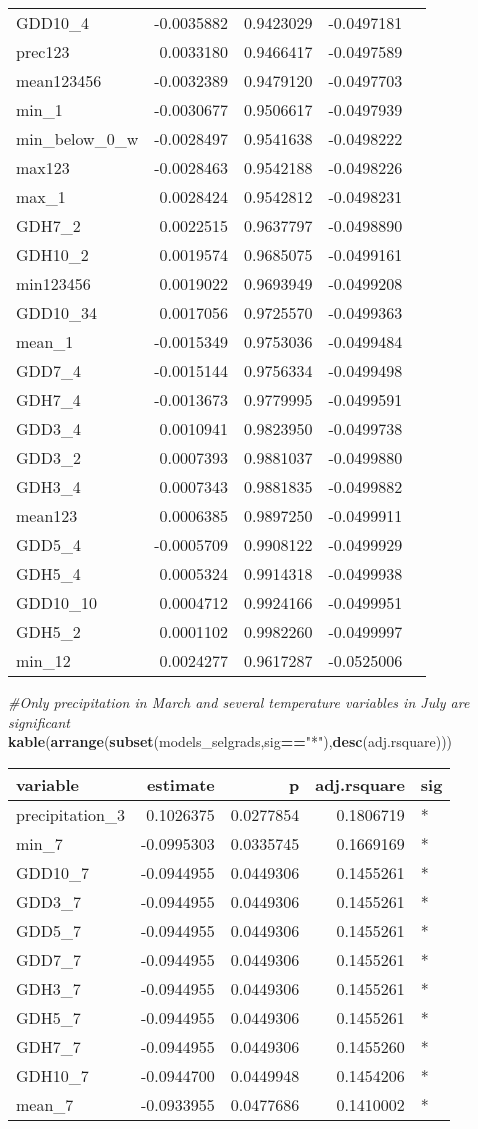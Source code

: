 \documentclass[]{article}
\newenvironment{Shaded}{\begin{snugshade}}{\end{snugshade}}
\newcommand{\KeywordTok}[1]{\textcolor[rgb]{0.13,0.29,0.53}{\textbf{#1}}}
\newcommand{\StringTok}[1]{\textcolor[rgb]{0.31,0.60,0.02}{#1}}
\newcommand{\CommentTok}[1]{\textcolor[rgb]{0.56,0.35,0.01}{\textit{#1}}}
\newcommand{\OperatorTok}[1]{\textcolor[rgb]{0.81,0.36,0.00}{\textbf{#1}}}
\newcommand{\NormalTok}[1]{#1}
\begin{document}
\begin{longtable}[]{@{}lrrrl@{}}
GDD10\_4 & -0.0035882 & 0.9423029 & -0.0497181 &\tabularnewline
prec123 & 0.0033180 & 0.9466417 & -0.0497589 &\tabularnewline
mean123456 & -0.0032389 & 0.9479120 & -0.0497703 &\tabularnewline
min\_1 & -0.0030677 & 0.9506617 & -0.0497939 &\tabularnewline
min\_below\_0\_w & -0.0028497 & 0.9541638 & -0.0498222 &\tabularnewline
max123 & -0.0028463 & 0.9542188 & -0.0498226 &\tabularnewline
max\_1 & 0.0028424 & 0.9542812 & -0.0498231 &\tabularnewline
GDH7\_2 & 0.0022515 & 0.9637797 & -0.0498890 &\tabularnewline
GDH10\_2 & 0.0019574 & 0.9685075 & -0.0499161 &\tabularnewline
min123456 & 0.0019022 & 0.9693949 & -0.0499208 &\tabularnewline
GDD10\_34 & 0.0017056 & 0.9725570 & -0.0499363 &\tabularnewline
mean\_1 & -0.0015349 & 0.9753036 & -0.0499484 &\tabularnewline
GDD7\_4 & -0.0015144 & 0.9756334 & -0.0499498 &\tabularnewline
GDH7\_4 & -0.0013673 & 0.9779995 & -0.0499591 &\tabularnewline
GDD3\_4 & 0.0010941 & 0.9823950 & -0.0499738 &\tabularnewline
GDD3\_2 & 0.0007393 & 0.9881037 & -0.0499880 &\tabularnewline
GDH3\_4 & 0.0007343 & 0.9881835 & -0.0499882 &\tabularnewline
mean123 & 0.0006385 & 0.9897250 & -0.0499911 &\tabularnewline
GDD5\_4 & -0.0005709 & 0.9908122 & -0.0499929 &\tabularnewline
GDH5\_4 & 0.0005324 & 0.9914318 & -0.0499938 &\tabularnewline
GDD10\_10 & 0.0004712 & 0.9924166 & -0.0499951 &\tabularnewline
GDH5\_2 & 0.0001102 & 0.9982260 & -0.0499997 &\tabularnewline
min\_12 & 0.0024277 & 0.9617287 & -0.0525006 &\tabularnewline
\bottomrule
\end{longtable}

\begin{Shaded}
\begin{Highlighting}[]
\CommentTok{#Only precipitation in March and several temperature variables in July are significant}
\KeywordTok{kable}\NormalTok{(}\KeywordTok{arrange}\NormalTok{(}\KeywordTok{subset}\NormalTok{(models_selgrads,sig}\OperatorTok{==}\StringTok{"*"}\NormalTok{),}\KeywordTok{desc}\NormalTok{(adj.rsquare)))}
\end{Highlighting}
\end{Shaded}

\begin{longtable}[]{@{}lrrrl@{}}
\toprule
variable & estimate & p & adj.rsquare & sig\tabularnewline
\midrule
\endhead
precipitation\_3 & 0.1026375 & 0.0277854 & 0.1806719 & *\tabularnewline
min\_7 & -0.0995303 & 0.0335745 & 0.1669169 & *\tabularnewline
GDD10\_7 & -0.0944955 & 0.0449306 & 0.1455261 & *\tabularnewline
GDD3\_7 & -0.0944955 & 0.0449306 & 0.1455261 & *\tabularnewline
GDD5\_7 & -0.0944955 & 0.0449306 & 0.1455261 & *\tabularnewline
GDD7\_7 & -0.0944955 & 0.0449306 & 0.1455261 & *\tabularnewline
GDH3\_7 & -0.0944955 & 0.0449306 & 0.1455261 & *\tabularnewline
GDH5\_7 & -0.0944955 & 0.0449306 & 0.1455261 & *\tabularnewline
GDH7\_7 & -0.0944955 & 0.0449306 & 0.1455260 & *\tabularnewline
GDH10\_7 & -0.0944700 & 0.0449948 & 0.1454206 & *\tabularnewline
mean\_7 & -0.0933955 & 0.0477686 & 0.1410002 & *\tabularnewline
\bottomrule
\end{longtable}
\end{document}
